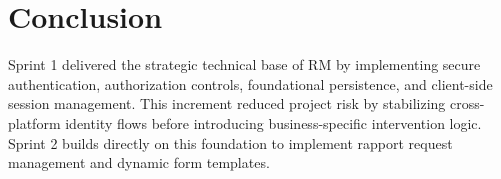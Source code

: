\section{Conclusion}

Sprint 1 delivered the strategic technical base of RM by implementing secure authentication, authorization controls, foundational persistence, and client-side session management. This increment reduced project risk by stabilizing cross-platform identity flows before introducing business-specific intervention logic. Sprint 2 builds directly on this foundation to implement rapport request management and dynamic form templates.

